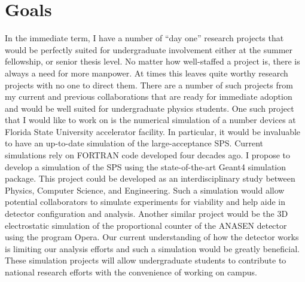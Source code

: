 {%
\section*{Goals}
In the immediate term, I have a number of ``day one'' research projects that would be perfectly suited for undergraduate involvement either at the summer fellowship, %
 or senior thesis level.
No matter how well-staffed a project is, there is always a need for more manpower.
At times %
this leaves quite worthy research projects with no one to direct them. There are a number of such projects from my current and previous collaborations that are ready for immediate adoption and would be well suited for undergraduate physics students.
One such project that I would like to work on %
is the numerical simulation of a number devices at Florida State University accelerator facility. In particular, it would be invaluable to have an up-to-date simulation of the large-acceptance SPS. Current simulations rely on FORTRAN code developed four decades ago. I propose to develop a simulation of the SPS  using the state-of-the-art Geant4 simulation package. This project could be developed as an interdisciplinary study between Physics, Computer Science, and Engineering. Such a simulation would allow potential collaborators to simulate experiments for viability and help aide in detector configuration and analysis. Another similar project would be the 3D electrostatic simulation of the proportional counter of the ANASEN detector using the program Opera. Our current understanding of how the detector works is limiting our analysis efforts and such a simulation would be greatly beneficial. These simulation projects will allow  undergraduate students  to contribute to national research efforts with the convenience of working on campus.

}
